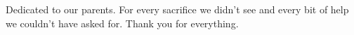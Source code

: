 
\begin{dedication}
	\addchaptertocentry{\dedicationname}
	\vspace{0.5cm}
	Dedicated to our parents. For every sacrifice we didn’t see and every bit of help we couldn't have asked for. Thank you for everything.
\end{dedication}
